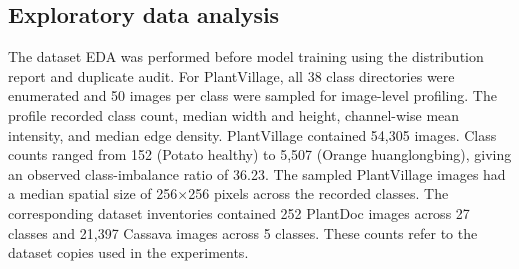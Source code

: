 \documentclass{sbc2023}%
\begin{document}
\subsection{Exploratory data analysis}
The dataset EDA was performed before model training using the distribution report and duplicate audit. For PlantVillage, all 38 class directories were enumerated and 50 images per class were sampled for image-level profiling. The profile recorded class count, median width and height, channel-wise mean intensity, and median edge density. PlantVillage contained 54,305 images. Class counts ranged from 152 (Potato healthy) to 5,507 (Orange huanglongbing), giving an observed class-imbalance ratio of 36.23. The sampled PlantVillage images had a median spatial size of 256$\times$256 pixels across the recorded classes. The corresponding dataset inventories contained 252 PlantDoc images across 27 classes and 21,397 Cassava images across 5 classes. These counts refer to the dataset copies used in the experiments.
\end{document}
